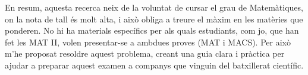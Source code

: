 En resum, aquesta recerca neix de la voluntat de cursar el grau de Matemàtiques, on la nota de tall és molt alta, i això obliga a treure el màxim en les matèries que ponderen. No hi ha materials específics per als quals estudiants, com jo, que han fet les MAT II, volen presentar-se a ambdues proves (MAT i MACS). Per això m'he proposat resoldre aquest problema, creant una guia clara i pràctica per ajudar a preparar aquest examen a companys que vinguin del batxillerat científic.
